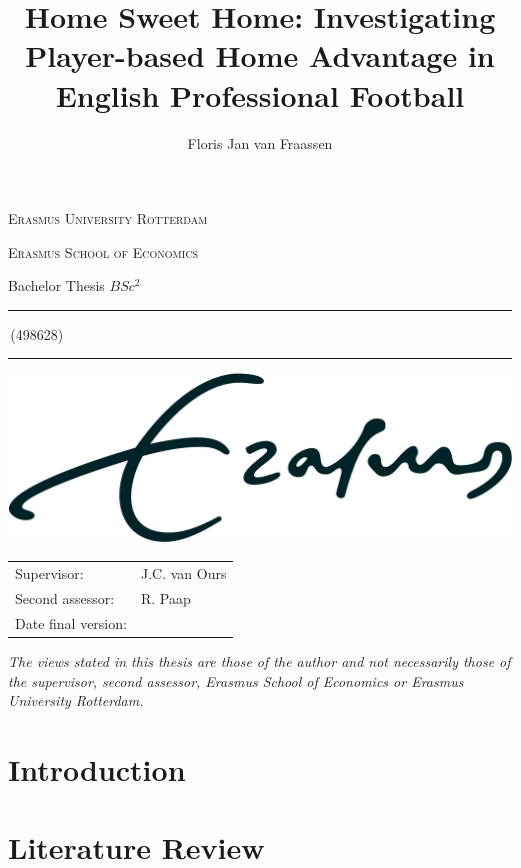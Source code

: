 \documentclass[a4paper,11pt]{article}
\author{Floris Jan van Fraassen}
\title{Home Sweet Home: Investigating Player-based Home Advantage in English Professional Football}
\newcommand{\studentnumber}{498628}
\newcommand{\program}{$BSc^2$}
\newcommand{\supervisor}{J.C. van Ours}
\newcommand{\secondassesor}{R. Paap}
\begin{document}
\begin{titlepage}
\makeatletter
\begin{center}
	\textsc{Erasmus University Rotterdam}
	\par \textsc{Erasmus School of Economics}
	\par Bachelor Thesis \program

	\vfill \hrule height .08em \bigskip
	\par\huge\@title\bigskip
	\par\Large\@author\,(\studentnumber)\bigskip
	\hrule height .08em\normalsize
	
	\vfill
	\includegraphics[width=\textwidth,height=0.15\textheight,keepaspectratio]{attachments/eur.png} %
	\vfill
	
	\begin{tabular}{ll}
		\toprule
		Supervisor: & \supervisor\\
		Second assessor: & \secondassesor\\
		Date final version: & \@date\\
		\bottomrule
	\end{tabular}

    \vfill
    \begin{abstract}
        
    \end{abstract}
	
	\vfill
	\textit{The views stated in this thesis are those of the author and not necessarily those of the supervisor, second assessor, Erasmus School of Economics or Erasmus University Rotterdam.}
\end{center}
\makeatother
\end{titlepage}



\section{Introduction}
\label{sec:introduction}


\newpage
\section{Literature Review}
\label{sec:literature review}

\end{document}

